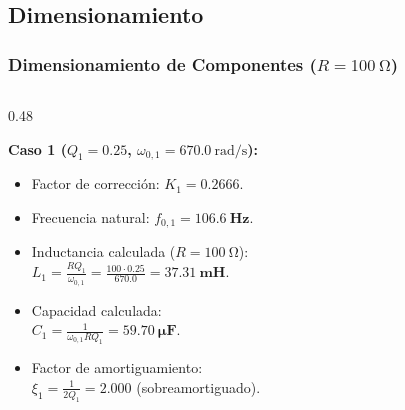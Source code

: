 \subsection{Dimensionamiento}
\begin{frame}
  \frametitle{Dimensionamiento de Componentes ($R = \qty{100}{\ohm}$)}

  \begin{columns}[t, onlytextwidth]
    \begin{column}{0.48\textwidth}
      \begin{tarjeta}
        {\fontsize{9pt}{11pt}\selectfont \textbf{\color{NavyDark} Caso 1 ($Q_1 = 0.25$, $\omega_{0,1} = \qty{670.0}{\radian\per\second}$):}}\\[2pt]
        {\fontsize{8pt}{10pt}\selectfont
        \begin{itemize}\setlength{\itemsep}{2.5pt}
          \item Factor de corrección: $K_1 = \mathbf{0.2666}$.
          \item Frecuencia natural: $f_{0,1} = \mathbf{\qty{106.6}{\hertz}}$.
          \item Inductancia calculada ($R = \qty{100}{\ohm}$):\\
          $L_1 = \frac{R Q_1}{\omega_{0,1}} = \frac{100 \cdot 0.25}{670.0} = \mathbf{\qty{37.31}{\milli\henry}}$.
          \item Capacidad calculada:\\
          $C_1 = \frac{1}{\omega_{0,1} R Q_1} = \mathbf{\qty{59.70}{\micro\farad}}$.
          \item Factor de amortiguamiento:\\
          $\xi_1 = \frac{1}{2 Q_1} = \mathbf{2.000}$ (sobreamortiguado).
        \end{itemize}
        }
      \end{tarjeta}
    \end{column}


\end{columns}
\end{frame}
